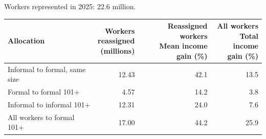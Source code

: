 {\small Workers represented in 2025: 22.6 million.\par}
\vspace{0.2cm}
\begin{tabular}{p{}rrr}
\toprule
Allocation & \shortstack{Workers\\reassigned\\(millions)} & \shortstack{Reassigned workers\\Mean income\\gain (\%)} & \shortstack{All workers\\Total income\\gain (\%)} \\
\midrule
Informal to formal, same size & 12.43 & 42.1 & 13.5 \\
Formal to formal 101+ & 4.57 & 14.2 & 3.8 \\
Informal to informal 101+ & 12.31 & 24.0 & 7.6 \\
\midrule
All workers to formal 101+ & 17.00 & 44.2 & 25.9 \\
\bottomrule\end{tabular}
